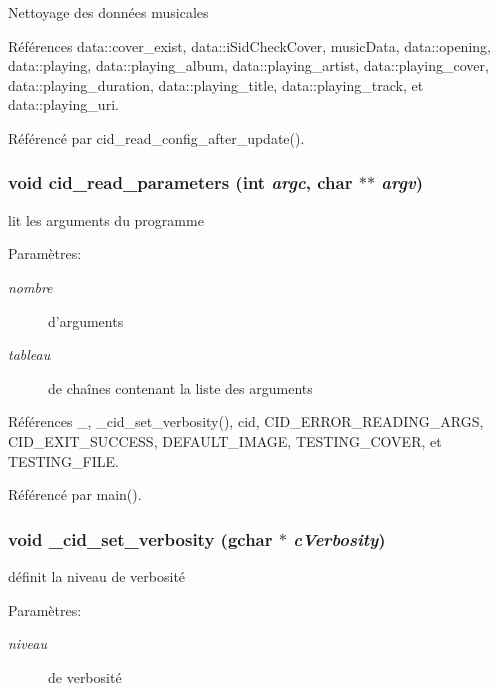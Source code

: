 Nettoyage des données musicales 

Références data::cover\_\-exist, data::iSidCheckCover, musicData, data::opening, data::playing, data::playing\_\-album, data::playing\_\-artist, data::playing\_\-cover, data::playing\_\-duration, data::playing\_\-title, data::playing\_\-track, et data::playing\_\-uri.

Référencé par cid\_\-read\_\-config\_\-after\_\-update().
\subsubsection{\setlength{\rightskip}{0pt plus 5cm}void cid\_\-read\_\-parameters (int {\em argc}, \/  char $\ast$$\ast$ {\em argv})}\label{cid-utilities_8c_a4c249f9f77ac45bcbf856a461413965}


lit les arguments du programme \begin{Desc}
\item[Paramètres:]
\begin{description}
\item[{\em nombre}]d'arguments \item[{\em tableau}]de chaînes contenant la liste des arguments \end{description}
\end{Desc}


Références \_\-, \_\-cid\_\-set\_\-verbosity(), cid, CID\_\-ERROR\_\-READING\_\-ARGS, CID\_\-EXIT\_\-SUCCESS, DEFAULT\_\-IMAGE, TESTING\_\-COVER, et TESTING\_\-FILE.

Référencé par main().
\subsubsection{\setlength{\rightskip}{0pt plus 5cm}void \_\-cid\_\-set\_\-verbosity (gchar $\ast$ {\em cVerbosity})}\label{cid-utilities_8c_b57ea7ec4a6b249a5d78d624a07b30d7}


définit la niveau de verbosité \begin{Desc}
\item[Paramètres:]
\begin{description}
\item[{\em niveau}]de verbosité \end{description}
\end{Desc}


